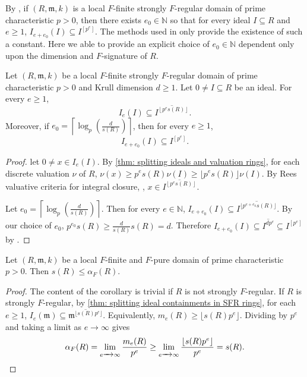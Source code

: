 \documentclass[12pt]{amsart}
\numberwithin{equation}{theorem}
\theoremstyle{plain}
\newcommand{\fm}{\mathfrak{m}}
\newcommand{\NN}{\mathbb{N}}
\begin{document}
By \cite[Main Theorem~2]{PolstraUSTP}, if $(R,\fm,k)$ is a local $F$-finite strongly $F$-regular domain of prime characteristic $p>0$, then there exists $e_0\in\NN$ so that for every ideal $I\subseteq R$ and $e\geq 1$, $I_{e+e_0}(I)\subseteq I^{[p^e]}$. The methods used in \cite{PolstraUSTP} only provide the existence of such a constant. Here we able to provide an explicit choice of $e_0\in\NN$ dependent only upon the dimension and $F$-signature of $R$. 

\begin{theorem}
    \label{thm: splitting ideal containments in SFR rings}
    Let $(R,\fm,k)$ be a local $F$-finite strongly $F$-regular domain of prime characteristic $p>0$ and Krull dimension $d\geq 1$. Let $0\not=I\subseteq R$ be an ideal. For every $e\geq 1$,
    \[
    I_e(I)\subseteq \overline{I^{\left\lfloor p^es(R)\right\rfloor}}.
    \]
    Moreover, if $e_0 = \left\lceil \log_p\left(\frac{d}{s(R)}\right)\right\rceil$, then for every $e\geq 1$,
    \[
    I_{e+e_0}(I)\subseteq I^{[p^e]}.
    \]
\end{theorem}

\begin{proof}
    let $0\not=x\in I_e(I)$. By \cref{thm: splitting ideals and valuation rings}, for each discrete valuation $\nu$ of $R$, $\nu(x)\geq p^es(R)\nu(I)\geq \lfloor p^es(R)\rfloor\nu(I)$.  By Rees valuative criteria for integral closure, \cite[Theorem 10.2.2(3)]{HunekeSwanson2006}, $x\in \overline{I^{\left\lfloor p^es(R)\right\rfloor}}$.
    
    Let $e_0 = \left\lceil \log_p\left(\frac{d}{s(R)}\right)\right\rceil$. Then for every $e\in\NN$, $I_{e+e_0}(I)\subseteq \overline{I^{\lfloor p^{e+e_0}s(R)\rfloor}}.$ By our choice of $e_0$, $p^{e_0}s(R)\geq \frac{d}{s(R)}s(R)=d$. Therefore $I_{e+e_0}(I)\subseteq \overline{I^{dp^e}}\subseteq I^{[p^e]}$ by \cite[Theorem 13.2.1 and Corollary 13.2.2]{HunekeSwanson2006}.
\end{proof}


\begin{corollary}
    \label{cor: F-sig lower bound for alpha F invariant}
    Let $(R,\fm,k)$ be a local $F$-finite and $F$-pure domain of prime characteristic $p>0$. Then $s(R)\leq \alpha_F(R)$.
\end{corollary}

\begin{proof}
    The content of the corollary is trivial if $R$ is not strongly $F$-regular. If $R$ is strongly $F$-regular, by \cref{thm: splitting ideal containments in SFR rings}, for each $e\geq 1$, $I_e(\fm)\subseteq \overline{\fm^{\lfloor s(R)p^e\rfloor}}$. Equivalently, $m_e(R)\geq \lfloor s(R)p^e\rfloor$. Dividing by $p^e$ and taking a limit as $e\to\infty$ gives
    \[
    \alpha_F(R) = \lim_{e\to\infty}\frac{m_e(R)}{p^e} \geq \lim_{e\to \infty}\frac{\lfloor s(R)p^e\rfloor}{p^e} = s(R).\qedhere
    \]
\end{proof}
\end{document}
